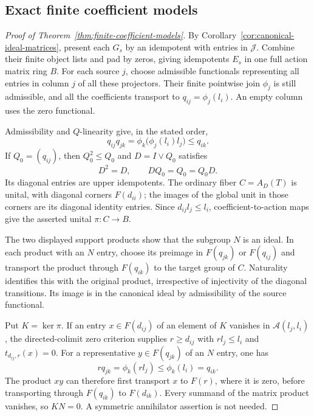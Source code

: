 \subsection{Exact finite coefficient models}
\begin{proof}[Proof of Theorem~\ref{thm:finite-coefficient-models}]
By Corollary~\ref{cor:canonical-ideal-matrices}, present each
$G_s$ by an idempotent with entries in $\mathcal J$. Combine their
finite object lists and pad by zeros, giving idempotents $E_s$ in
one full action matrix ring $B$. For each source $j$, choose
admissible functionals representing all entries in column $j$ of
all these projectors. Their finite pointwise join $\phi_j$ is
still admissible, and all the coefficients transport to
$q_{ij}=\phi_j(l_i)$. An empty column uses the zero functional.

Admissibility and $Q$-linearity give, in the stated order,
\begin{equation}\label{eq:finite-coefficient-supports}
 q_{ij}q_{jk}
 =\phi_k\bigl(\phi_j(l_i)l_j\bigr)\leq q_{ik}.
\end{equation}
If $Q_0=(q_{ij})$, then $Q_0^2\leq Q_0$ and
$D=I\vee Q_0$ satisfies
\[
 D^2=D,\qquad DQ_0=Q_0=Q_0D.
\]
Its diagonal entries are upper idempotents. The ordinary fiber
$C=A_D(T)$ is unital, with diagonal corners $F(d_{ii})$; the
images of the global unit in those corners are its diagonal
identity entries. Since $d_{ij}l_j\leq l_i$, coefficient-to-action
maps give the asserted unital $\pi:C\to B$.

The two displayed support products show that the subgroup $N$
is an ideal. In each product with an $N$ entry, choose its
preimage in $F(q_{jk})$ or $F(q_{ij})$ and transport the product
through $F(q_{ik})$ to the target group of $C$. Naturality
identifies this with the original product, irrespective of
injectivity of the diagonal transitions. Its image is in the
canonical ideal by admissibility of the source functional.

Put $K=\ker\pi$. If an entry $x\in F(d_{ij})$ of an element of
$K$ vanishes in $\mathcal A(l_j,l_i)$, the directed-colimit zero
criterion supplies $r\geq d_{ij}$ with $rl_j\leq l_i$ and
$t_{d_{ij},r}(x)=0$. For a representative
$y\in F(q_{jk})$ of an $N$ entry, one has
\[
 rq_{jk}=\phi_k(rl_j)\leq\phi_k(l_i)=q_{ik}.
\]
The product $xy$ can therefore first transport $x$ to $F(r)$,
where it is zero, before transporting through $F(q_{ik})$ to
$F(d_{ik})$. Every summand of the matrix product vanishes, so
$KN=0$. A symmetric annihilator assertion is not needed.


\end{proof}
